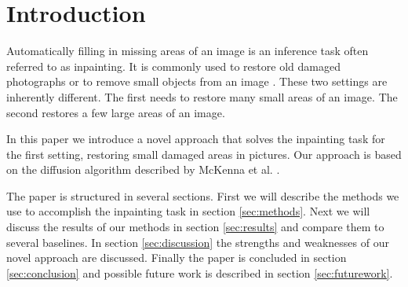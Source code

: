 \section{Introduction}
\label{sec:introduction}

Automatically filling in missing areas of an image is an inference task often referred to as inpainting. It is commonly used to restore old damaged photographs or to remove small objects from an image \cite{bertalmio2000image}. These two settings are inherently different. The first needs to restore many small areas of an image. The second restores a few large areas of an image.

In this paper we introduce a novel approach that solves the inpainting task for the first setting, restoring small damaged areas in pictures. Our approach is based on the diffusion algorithm described by McKenna et al. \cite{richard2001fast}.

The paper is structured in several sections. First we will describe the methods we use to accomplish the inpainting task in section \ref{sec:methods}. Next we will discuss the results of our methods in section \ref{sec:results} and compare them to several baselines. In section \ref{sec:discussion} the strengths and weaknesses of our novel approach are discussed. Finally the paper is concluded in section \ref{sec:conclusion} and possible future work is described in section \ref{sec:futurework}.
